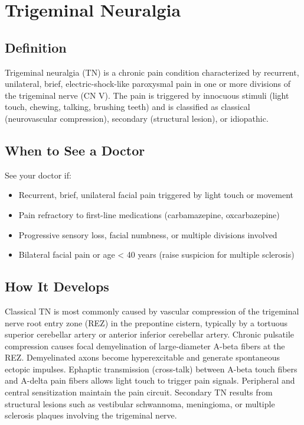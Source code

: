 \chapter{Trigeminal Neuralgia}

\section*{Definition}
Trigeminal neuralgia (TN) is a chronic pain condition characterized by recurrent, unilateral, brief, electric-shock-like paroxysmal pain in one or more divisions of the trigeminal nerve (CN V). The pain is triggered by innocuous stimuli (light touch, chewing, talking, brushing teeth) and is classified as classical (neurovascular compression), secondary (structural lesion), or idiopathic.

\section*{When to See a Doctor}
See your doctor if:
\begin{itemize}
  \item Recurrent, brief, unilateral facial pain triggered by light touch or movement
  \item Pain refractory to first-line medications (carbamazepine, oxcarbazepine)
  \item Progressive sensory loss, facial numbness, or multiple divisions involved
  \item Bilateral facial pain or age < 40 years (raise suspicion for multiple sclerosis)
\end{itemize}

\section*{How It Develops}
Classical TN is most commonly caused by vascular compression of the trigeminal nerve root entry zone (REZ) in the prepontine cistern, typically by a tortuous superior cerebellar artery or anterior inferior cerebellar artery. Chronic pulsatile compression causes focal demyelination of large-diameter A-beta fibers at the REZ. Demyelinated axons become hyperexcitable and generate spontaneous ectopic impulses. Ephaptic transmission (cross-talk) between A-beta touch fibers and A-delta pain fibers allows light touch to trigger pain signals. Peripheral and central sensitization maintain the pain circuit. Secondary TN results from structural lesions such as vestibular schwannoma, meningioma, or multiple sclerosis plaques involving the trigeminal nerve.

